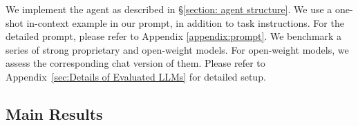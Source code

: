 We implement the agent as described in \S \ref{section: agent structure}.
We use a one-shot in-context example in our prompt, in addition to task instructions. 
For the detailed prompt, please refer to Appendix \ref{appendix:prompt}.
We benchmark a series of strong proprietary and open-weight models. For open-weight models, we assess the corresponding chat version of them. 
Please refer to Appendix~\ref{sec:Details of Evaluated LLMs} for detailed setup. 



\subsection{Main Results}
\label{sec:res}
% 

